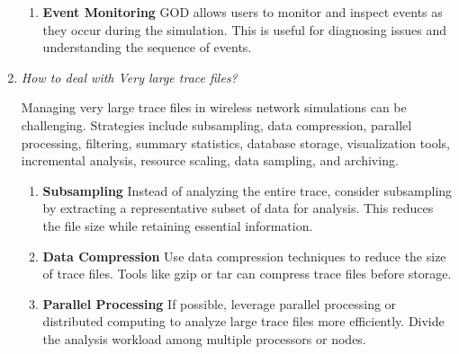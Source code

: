 \documentclass[11pt]{article}
\begin{document}
\begin{enumerate}
\begin{enumerate}
              \item \textbf{Event Monitoring} GOD allows users to monitor and inspect events as they occur during the simulation. This is useful for diagnosing issues and understanding the sequence of events.

          \end{enumerate}


    \item \textit{How to deal with Very large trace files?}

          Managing very large trace files in wireless network simulations can be challenging. Strategies include subsampling, data compression, parallel processing, filtering, summary statistics, database storage, visualization tools, incremental analysis, resource scaling, data sampling, and archiving.


          \begin{enumerate}
              \item \textbf{Subsampling} Instead of analyzing the entire trace, consider subsampling by extracting a representative subset of data for analysis. This reduces the file size while retaining essential information.

              \item \textbf{Data Compression} Use data compression techniques to reduce the size of trace files. Tools like gzip or tar can compress trace files before storage.

              \item \textbf{Parallel Processing} If possible, leverage parallel processing or distributed computing to analyze large trace files more efficiently. Divide the analysis workload among multiple processors or nodes.

          \end{enumerate}

\end{enumerate}
\end{document}
